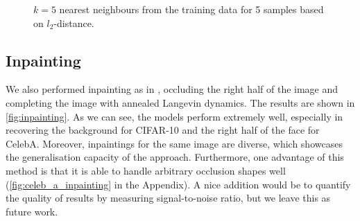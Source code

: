 \begin{figure}[h!]
  \centering
     \hspace{3mm}
     \hspace{3mm}
     \caption{$k=5$ nearest neighbours from the training data for 5 samples based on $l_2$-distance.}
     \label{fig:nn}
     \vspace{-3mm}
\end{figure}

\subsection{Inpainting}
We also performed inpainting as in \cite{ncsn-paper}, occluding the right half of the image and completing the image with annealed Langevin dynamics. The results are shown in \autoref{fig:inpainting}. As we can see, the models perform extremely well, especially in recovering the background for CIFAR-10 and the right half of the face for CelebA. Moreover, inpaintings for the same image are diverse, which showcases the generalisation capacity of the approach. Furthermore, one advantage of this method is that it is able to handle arbitrary occlusion shapes well (\autoref{fig:celeb_a_inpainting} in the Appendix). A nice addition would be to quantify the quality of results by measuring signal-to-noise ratio, but we leave this as future work.\vspace{-3mm}

